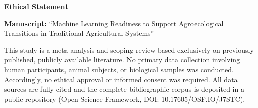 \documentclass[12pt]{article}
\begin{document}
\begin{center}
{\Large\bfseries Ethical Statement}
\end{center}

\vspace{12pt}

\noindent
\textbf{Manuscript:} ``Machine Learning Readiness to Support Agroecological Transitions in Traditional Agricultural Systems''

\vspace{12pt}

\noindent
This study is a meta-analysis and scoping review based exclusively on previously published, publicly available literature. No primary data collection involving human participants, animal subjects, or biological samples was conducted. Accordingly, no ethical approval or informed consent was required. All data sources are fully cited and the complete bibliographic corpus is deposited in a public repository (Open Science Framework, DOI: 10.17605/OSF.IO/J7STC).
\end{document}
